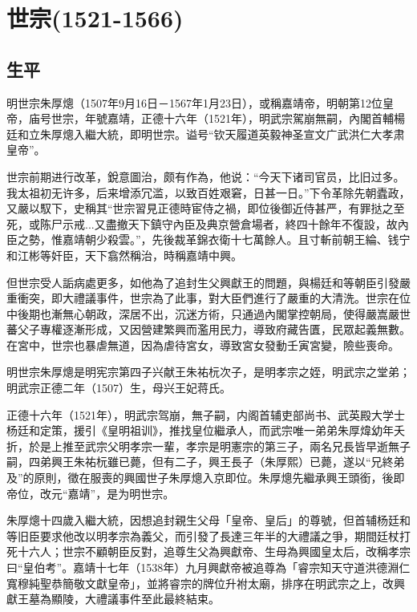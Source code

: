 
\section{世宗\tiny(1521-1566)}

\subsection{生平}

明世宗朱厚熜（1507年9月16日－1567年1月23日），或稱嘉靖帝，明朝第12位皇帝，庙号世宗，年號嘉靖，正德十六年（1521年），明武宗駕崩無嗣，內閣首輔楊廷和立朱厚熜入繼大統，即明世宗。谥号“钦天履道英毅神圣宣文广武洪仁大孝肃皇帝”。

世宗前期进行改革，銳意圖治，颇有作為，他说：“今天下诸司官员，比旧过多。我太祖初无许多，后来增添冗滥，以致百姓艰窘，日甚一日。”下令革除先朝蠹政，又嚴以馭下，史稱其“世宗習見正德時宦侍之禍，即位後御近侍甚严，有罪挞之至死，或陈尸示戒...又盡撤天下鎮守內臣及典京營倉場者，終四十餘年不復設，故內臣之勢，惟嘉靖朝少殺雲。”，先後裁革錦衣衛十七萬餘人。且寸斬前朝王綸、钱宁和江彬等奸臣，天下翕然稱治，時稱嘉靖中興。

但世宗受人詬病處更多，如他為了追封生父興獻王的問題，與楊廷和等朝臣引發嚴重衝突，即大禮議事件，世宗為了此事，對大臣們進行了嚴重的大清洗。世宗在位中後期也漸無心朝政，深居不出，沉迷方術，只通過內閣掌控朝局，使得嚴嵩嚴世蕃父子專權逐漸形成，又因營建繁興而濫用民力，導致府藏告匱，民眾起義無數。在宮中，世宗也暴虐無道，因為虐待宮女，導致宮女發動壬寅宮變，險些喪命。

明世宗朱厚熜是明宪宗第四子兴献王朱祐杬次子，是明孝宗之姪，明武宗之堂弟；明武宗正德二年（1507）生，母兴王妃蒋氏。

正德十六年（1521年），明武宗驾崩，無子嗣，内阁首辅吏部尚书、武英殿大学士杨廷和定策，援引《皇明祖训》，推找皇位繼承人，而武宗唯一弟弟朱厚煒幼年夭折，於是上推至武宗父明孝宗一輩，孝宗是明憲宗的第三子，兩名兄長皆早逝無子嗣，四弟興王朱祐杬雖已薨，但有二子，興王長子（朱厚熙）已薨，遂以“兄終弟及”的原則，徵在服喪的興國世子朱厚熜入京即位。朱厚熜先繼承興王頭銜，後即帝位，改元“嘉靖”，是为明世宗。

朱厚熜十四歲入繼大統，因想追封親生父母「皇帝、皇后」的尊號，但首辅杨廷和等旧臣要求他改以明孝宗為義父，而引發了長達三年半的大禮議之爭，期間廷杖打死十六人；世宗不顧朝臣反對，追尊生父為興獻帝、生母為興國皇太后，改稱孝宗曰“皇伯考”。嘉靖十七年（1538年）九月興獻帝被追尊為「睿宗知天守道洪德淵仁寬穆純聖恭簡敬文獻皇帝」，並將睿宗的牌位升袝太廟，排序在明武宗之上，改興獻王墓為顯陵，大禮議事件至此最終結束。

